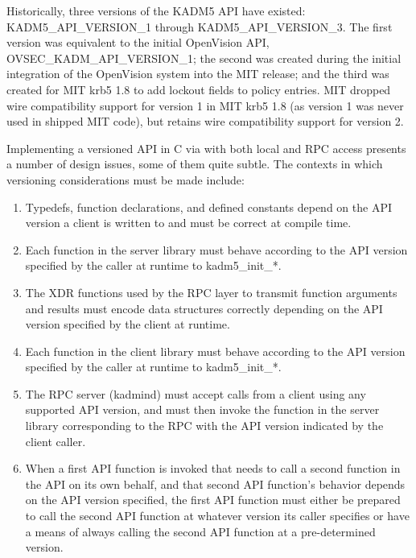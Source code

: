 Historically, three versions of the KADM5 API have existed:
KADM5_API_VERSION_1 through KADM5_API_VERSION_3.  The first version
was equivalent to the initial OpenVision API,
OVSEC_KADM_API_VERSION_1; the second was created during the initial
integration of the OpenVision system into the MIT release; and the
third was created for MIT krb5 1.8 to add lockout fields to policy
entries.  MIT dropped wire compatibility support for version 1 in MIT
krb5 1.8 (as version 1 was never used in shipped MIT code), but
retains wire compatibility support for version 2.

Implementing a versioned API in C via with both local and RPC access
presents a number of design issues, some of them quite subtle.  The
contexts in which versioning considerations must be made include:

\begin{enumerate}
\item Typedefs, function declarations, and defined constants depend on
the API version a client is written to and must be correct at compile
time.

\item Each function in the server library must behave according to the
API version specified by the caller at runtime to kadm5_init_*.

\item The XDR functions used by the RPC layer to transmit function
arguments and results must encode data structures correctly depending
on the API version specified by the client at runtime.

\item Each function in the client library must behave according to the
API version specified by the caller at runtime to kadm5_init_*.

\item The RPC server (kadmind) must accept calls from a client using
any supported API version, and must then invoke the function in the
server library corresponding to the RPC with the API version indicated
by the client caller.

\item When a first API function is invoked that needs to call a second
function in the API on its own behalf, and that second API function's
behavior depends on the API version specified, the first API function
must either be prepared to call the second API function at whatever
version its caller specifies or have a means of always calling the
second API function at a pre-determined version.
\end{enumerate}

